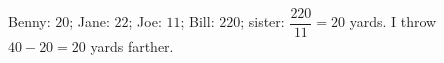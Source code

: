 Benny: \(20\); Jane: \(22\); Joe: \(11\); Bill: \(220\); sister: \(\dfrac{220}{11}=20\) yards. I throw \(40-20=\boxed{20}\) yards farther.
